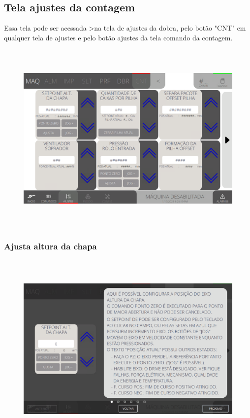 \thispagestyle{fancy}
\vspace*{\fill}
\subsection{Tela ajustes da contagem}
 Essa tela pode ser acessada \textgreater na tela de ajustes da dobra, pelo botão "CNT" em qualquer tela de ajustes e pelo botão ajustes da tela comando da contagem.
\begin{figure}[h]
  \centering
  \includegraphics[width=576px,height=360px]{src/imagesFlexo/08-count/settings/e-Tela-Principal.png}
\end{figure}

\newpage
\thispagestyle{fancy}
\vspace*{\fill}
\subsubsection{\small{Ajusta altura da chapa}}
\begin{figure}[h]
  \centering
  \includegraphics[width=576px,height=360px]{src/imagesFlexo/08-count/settings/e-1.png}
\end{figure}
\vspace*{\fill}

